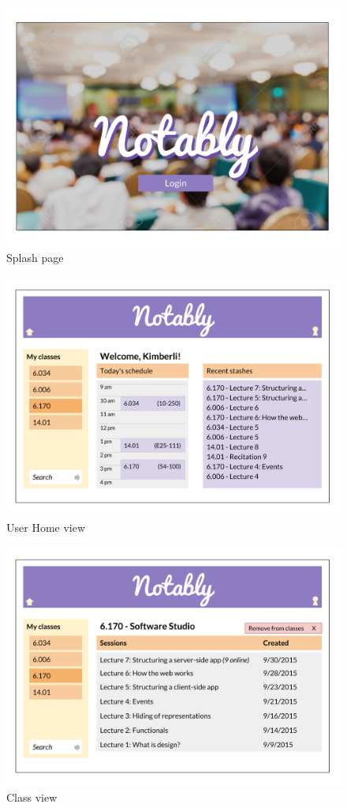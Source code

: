\documentclass{article}
\begin{document}
\begin{figure}[htbp!]
  \caption{Splash page}
  \centering
    \includegraphics[width=6in]{UI4.png}
\end{figure}

\begin{figure}[htbp!]
  \caption{User Home view}
  \centering
    \includegraphics[width=6in]{UI3.png}
\end{figure}

\begin{figure}[htbp!]
  \caption{Class view}
  \centering
    \includegraphics[width=6in]{UI2.png}
\end{figure}
\end{document}
